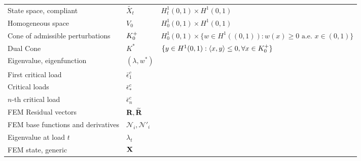 \documentclass[10pt]{article}
\begin{document}
\begin{table}[h!]
\begin{tabular}{  m{6.5cm}  m{3cm}  m{5cm}  }
        State space, compliant              & $\widetilde{X_t}$                                  & $H^1_t(0,1)\times  H^1(0,1)$                                                    \\
        Homogeneous space                   & $V_0$                                              & $H^1_0(0,1)\times  H^1(0,1)$                                                    \\
        Cone of admissible perturbations    & $K^+_{0}$                                       & $H^1_0(0, 1)\times \{w \in H^1((0, 1)): w(x) \geq 0 \text{ a.e. }x\in (0, 1)\}$ \\
        Dual Cone                           & $K^*$                                              & $\{y \in H^1(0,1): \langle x,y \rangle \leq 0, \forall x \in K^+_{0}\}$      \\
        Eigenvalue, eigenfunction           & $(\lambda, w^*)$                                   &                                                                                 \\
        First critical load                 & $\bar \epsilon^c_1$                                &                                                                                 \\
        Critical loads                      & $\bar \epsilon^c_*$                                &                                                                                 \\
        $n$-th critical load                & $\bar \epsilon^c_n$                                &                                                                                 \\
        FEM Residual vectors                & ${\bf R}, \widetilde{\bf R}$                       &                                                                                 \\
        FEM base functions and derivatives  & ${\mathcal N}_i, {\mathcal N}'_i$                  &                                                                                 \\
        Eigenvalue at load $t$              & $\lambda_t$                                        &                                                                                 \\
        FEM state, generic                  & $\mathbf{X}$                                        &                                                                                 \\

\end{tabular}
\end{table}
\end{document}
